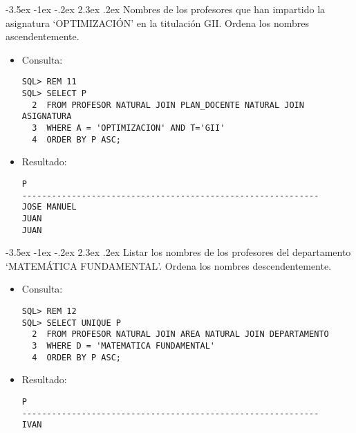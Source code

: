 \documentclass[11pt]{report}
\makeatletter
\renewcommand\chapter{\@startsection{chapter}{0}{\z@}%
    {-3.5ex \@plus -1ex \@minus -.2ex}%
    {2.3ex \@plus.2ex}%
    {\normalfont\Large\bfseries}}
\makeatother
\begin{document}
\chapter{Nombres de los profesores que han impartido la asignatura ‘OPTIMIZACIÓN’ en la titulación GII. Ordena los nombres ascendentemente.}
\begin{itemize}
  \item Consulta:
  \begin{verbatim}
SQL> REM 11
SQL> SELECT P
  2  FROM PROFESOR NATURAL JOIN PLAN_DOCENTE NATURAL JOIN ASIGNATURA
  3  WHERE A = 'OPTIMIZACION' AND T='GII'
  4  ORDER BY P ASC;
  \end{verbatim}
  \item{Resultado:}
  \begin{verbatim}
P                                                                               
------------------------------------------------------------                    
JOSE MANUEL                                                                     
JUAN                                                                            
JUAN  
  \end{verbatim}
\end{itemize}

\chapter{Listar los nombres de los profesores del departamento ‘MATEMÁTICA FUNDAMENTAL’. Ordena los nombres descendentemente.}
\begin{itemize}
  \item Consulta:
  \begin{verbatim}
SQL> REM 12
SQL> SELECT UNIQUE P
  2  FROM PROFESOR NATURAL JOIN AREA NATURAL JOIN DEPARTAMENTO
  3  WHERE D = 'MATEMATICA FUNDAMENTAL'
  4  ORDER BY P ASC;
  \end{verbatim}
  \item{Resultado:}
  \begin{verbatim}
P                                                                               
------------------------------------------------------------                    
IVAN  
  \end{verbatim}
\end{itemize}
\end{document}
